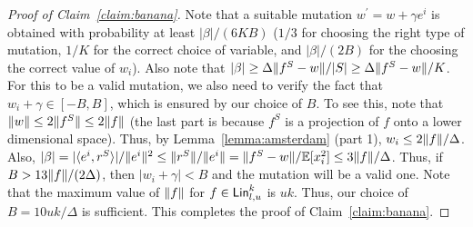 \begin{proof}[Proof of Claim~\ref{claim:banana}]
Note that a suitable mutation $w^\prime = w + \gamma e^i$ is obtained with
probability at least $|\beta|/(6KB)$ ($1/3$ for choosing the right type of
mutation, $1/K$ for the correct choice of variable, and $|\beta|/(2B)$ for the
choosing the correct value of $w_i$).  Also note that
$|\beta| \geq \Delta \Vert f^S - w \Vert / |S| \geq \Delta \Vert f^S - w \Vert / K$.
For this to be a valid mutation, we also need to verify the fact that $w_i + \gamma
\in [-B, B]$, which is ensured by our choice of $B$. To see this, note that
$\Vert w \Vert \leq 2 \Vert f^S \Vert \leq 2 \Vert f \Vert$ (the last part is
because $f^S$ is a projection of $f$ onto a lower dimensional space). Thus, by
Lemma~\ref{lemma:amsterdam} (part 1), $w_i \leq 2 \Vert f \Vert / \Delta$. Also,
$|\beta| = |\langle e^i, r^S \rangle|/\Vert e^i \Vert^2 \leq \Vert r^S \Vert/\Vert e^i \Vert
= \Vert f^S - w \Vert/\mathbb{E}[x_i^2] \leq 3 \Vert f \Vert/\Delta$.
Thus, if $B > 13 \Vert f \Vert/ (2\Delta)$, then $|w_i + \gamma| < B$ and the
mutation will be a valid one. Note that the maximum value of $\Vert f \Vert$ for
$f \in \mathsf{Lin}^k_{l, u}$ is $uk$. Thus, our choice of $B = 10 uk / \Delta$ is
sufficient.  This completes the proof of Claim~\ref{claim:banana}.
\end{proof}

